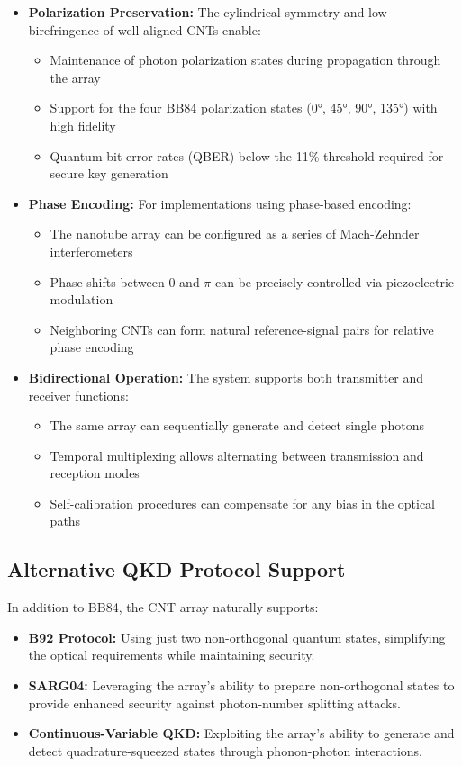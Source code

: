 \documentclass[11pt]{article}
\begin{document}
	\begin{itemize}
		\item \textbf{Polarization Preservation:} The cylindrical symmetry and low birefringence of well-aligned CNTs enable:
		\begin{itemize}
			\item Maintenance of photon polarization states during propagation through the array
			\item Support for the four BB84 polarization states (0°, 45°, 90°, 135°) with high fidelity
			\item Quantum bit error rates (QBER) below the 11\% threshold required for secure key generation
		\end{itemize}
		
		\item \textbf{Phase Encoding:} For implementations using phase-based encoding:
		\begin{itemize}
			\item The nanotube array can be configured as a series of Mach-Zehnder interferometers
			\item Phase shifts between 0 and $\pi$ can be precisely controlled via piezoelectric modulation
			\item Neighboring CNTs can form natural reference-signal pairs for relative phase encoding
		\end{itemize}
		
		\item \textbf{Bidirectional Operation:} The system supports both transmitter and receiver functions:
		\begin{itemize}
			\item The same array can sequentially generate and detect single photons
			\item Temporal multiplexing allows alternating between transmission and reception modes
			\item Self-calibration procedures can compensate for any bias in the optical paths
		\end{itemize}
	\end{itemize}
	
	\subsection{Alternative QKD Protocol Support}
	In addition to BB84, the CNT array naturally supports:
	
	\begin{itemize}
		\item \textbf{B92 Protocol:} Using just two non-orthogonal quantum states, simplifying the optical requirements while maintaining security.
		
		\item \textbf{SARG04:} Leveraging the array's ability to prepare non-orthogonal states to provide enhanced security against photon-number splitting attacks.
		
		\item \textbf{Continuous-Variable QKD:} Exploiting the array's ability to generate and detect quadrature-squeezed states through phonon-photon interactions.
	\end{itemize}
	
\end{document}
